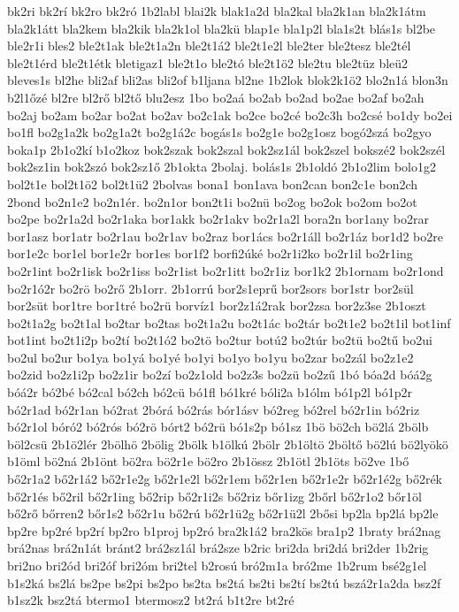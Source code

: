 {bk2ri
bk2rí
bk2ro
bk2ró
1b2labl
blai2k
blak1a2d
bla2kal
bla2k1an
bla2k1átm
bla2k1átt
bla2kem
bla2kik
bla2k1ol
bla2kü
blap1e
bla1p2l
bla1s2t
blás1s
bl2be
ble2r1i
bles2
ble2t1ak
ble2t1a2n
ble2t1á2
ble2t1e2l
ble2ter
ble2tesz
ble2tél
ble2t1érd
ble2t1étk
bletigaz1
ble2t1o
ble2tó
ble2t1ö2
ble2tu
ble2tüz
bleü2
bleves1s
bl2he
bli2af
bli2as
bli2of
b1ljana
bl2ne
1b2lok
blok2k1ö2
blo2n1á
blon3n
b2l1őzé
bl2re
bl2rő
bl2tő
blu2esz
1bo
bo2aá
bo2ab
bo2ad
bo2ae
bo2af
bo2ah
bo2aj
bo2am
bo2ar
bo2at
bo2av
bo2c1ak
bo2ce
bo2cé
bo2c3h
bo2csé
bo1dy
bo2ei
bo1fl
bo2g1a2k
bo2g1a2t
bo2g1á2c
bogás1s
bo2g1e
bo2g1osz
bogó2szá
bo2gyo
boka1p
2b1o2kí
b1o2koz
bok2szak
bok2szal
bok2sz1ál
bok2szel
bokszé2
bok2szél
bok2sz1in
bok2szó
bok2sz1ő
2b1okta
2bolaj.
bolás1s
2b1oldó
2b1o2lim
bolo1g2
bol2t1e
bol2t1ö2
bol2t1ü2
2bolvas
bona1
bon1ava
bon2can
bon2c1e
bon2ch
2bond
bo2n1e2
bo2n1ér.
bo2n1or
bon2t1i
bo2nü
bo2og
bo2ok
bo2om
bo2ot
bo2pe
bo2r1a2d
bo2r1aka
bor1akk
bo2r1akv
bo2r1a2l
bora2n
bor1any
bo2rar
bor1asz
bor1atr
bo2r1au
bo2r1av
bo2raz
bor1ács
bo2r1áll
bo2r1áz
bor1d2
bo2re
bor1e2c
bor1el
bor1e2r
bor1es
bor1f2
borfi2úké
bo2r1i2ko
bo2r1il
bo2r1ing
bo2r1int
bo2r1isk
bo2r1iss
bo2r1ist
bo2r1itt
bo2r1iz
bor1k2
2b1ornam
bo2r1ond
bo2r1ó2r
bo2rö
bo2rő
2b1orr.
2b1orrú
bor2s1eprű
bor2sors
bor1str
bor2sül
bor2süt
bor1tre
bor1tré
bo2rü
borvíz1
bor2z1á2rak
bor2zsa
bor2z3se
2b1oszt
bo2t1a2g
bo2t1al
bo2tar
bo2tas
bo2t1a2u
bo2t1ác
bo2tár
bo2t1e2
bo2t1il
bot1inf
bot1int
bo2t1i2p
bo2tí
bo2t1ó2
bo2tö
bo2tur
botú2
bo2túr
bo2tü
bo2tű
bo2ui
bo2ul
bo2ur
bo1ya
bo1yá
bo1yé
bo1yi
bo1yo
bo1yu
bo2zar
bo2zál
bo2z1e2
bo2zid
bo2z1i2p
bo2z1ir
bo2zí
bo2z1old
bo2z3s
bo2zü
bo2zű
1bó
bóa2d
bóá2g
bóá2r
bó2bé
bó2cal
bó2ch
bó2cü
bó1fl
bó1kré
bóli2a
b1ólm
bó1p2l
bó1p2r
bó2r1ad
bó2r1an
bó2rat
2bórá
bó2rás
bór1ásv
bó2reg
bó2rel
bó2r1in
bó2riz
bó2r1ol
bóró2
bó2rós
bó2rö
bórt2
bó2rü
bó1s2p
bó1sz
1bö
bö2ch
bö2lá
2bölb
böl2csü
2b1ö2lér
2bölhö
2bölig
2bölk
b1ölkú
2bölr
2b1öltö
2böltő
bö2lú
bö2lyökö
b1öml
bö2ná
2b1önt
bö2ra
bö2r1e
bö2ro
2b1össz
2b1ötl
2b1öts
bö2ve
1bő
bő2r1a2
bő2r1á2
bő2r1e2g
bő2r1e2l
bő2r1em
bő2r1en
bő2r1e2r
bő2r1é2g
bő2rék
bő2r1és
bő2ril
bő2r1ing
bő2rip
bő2r1i2s
bő2riz
bőr1izg
2bőrl
bő2r1o2
bőr1öl
bő2rő
bőrren2
bőr1s2
bő2r1u
bő2rú
bő2r1ü2g
bő2r1ü2l
2bősi
bp2la
bp2lá
bp2le
bp2re
bp2ré
bp2rí
bp2ro
b1proj
bp2ró
bra2k1á2
bra2kös
bra1p2
1braty
brá2nag
brá2nas
brá2n1át
bránt2
brá2sz1ál
brá2sze
b2ric
bri2da
bri2dá
bri2der
1b2rig
bri2no
bri2ód
bri2óf
bri2óm
bri2tel
b2rosú
bró2m1a
bró2me
1b2rum
bsé2g1el
b1s2ká
bs2lá
bs2pe
bs2pi
bs2po
bs2ta
bs2tá
bs2ti
bs2tí
bs2tú
bszá2r1a2da
bsz2f
b1sz2k
bsz2tá
btermo1
btermosz2
bt2rá
b1t2re
bt2ré
}
